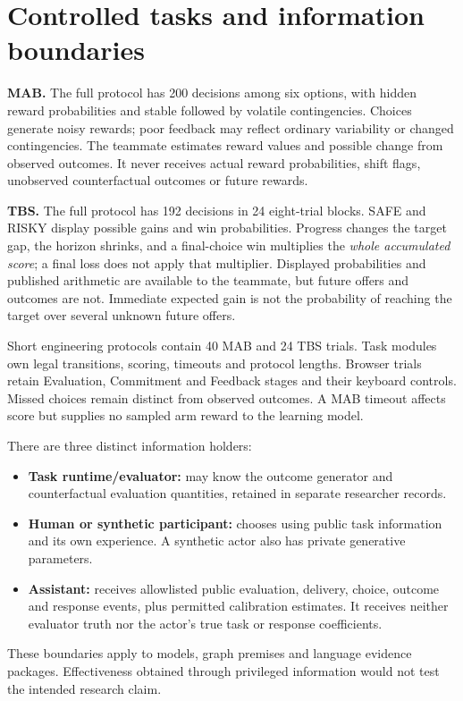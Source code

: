 \documentclass[11pt,a4paper]{article}
\begin{document}
\section{Controlled tasks and information boundaries}
\textbf{MAB.} The full protocol has 200 decisions among six options, with hidden reward probabilities and stable followed by volatile contingencies. Choices generate noisy rewards; poor feedback may reflect ordinary variability or changed contingencies. The teammate estimates reward values and possible change from observed outcomes. It never receives actual reward probabilities, shift flags, unobserved counterfactual outcomes or future rewards.

\textbf{TBS.} The full protocol has 192 decisions in 24 eight-trial blocks. SAFE and RISKY display possible gains and win probabilities. Progress changes the target gap, the horizon shrinks, and a final-choice win multiplies the \emph{whole accumulated score}; a final loss does not apply that multiplier. Displayed probabilities and published arithmetic are available to the teammate, but future offers and outcomes are not. Immediate expected gain is not the probability of reaching the target over several unknown future offers.

Short engineering protocols contain 40 MAB and 24 TBS trials. Task modules own legal transitions, scoring, timeouts and protocol lengths. Browser trials retain Evaluation, Commitment and Feedback stages and their keyboard controls. Missed choices remain distinct from observed outcomes. A MAB timeout affects score but supplies no sampled arm reward to the learning model.

There are three distinct information holders:
\begin{itemize}
\item \textbf{Task runtime/evaluator:} may know the outcome generator and counterfactual evaluation quantities, retained in separate researcher records.
\item \textbf{Human or synthetic participant:} chooses using public task information and its own experience. A synthetic actor also has private generative parameters.
\item \textbf{Assistant:} receives allowlisted public evaluation, delivery, choice, outcome and response events, plus permitted calibration estimates. It receives neither evaluator truth nor the actor's true task or response coefficients.
\end{itemize}
These boundaries apply to models, graph premises and language evidence packages. Effectiveness obtained through privileged information would not test the intended research claim.
\end{document}
